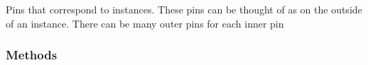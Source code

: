 \documentclass[letterpaper,10pt,english,openany,oneside]{sphinxmanual}
\begin{document}
\begin{fulllineitems}
\label{\detokenize{reference/classes/outerpin:spydrnet.OuterPin}}
Pins that correspond to instances. These pins can be thought of as on the outside of an instance. There can be many
outer pins for each inner pin

\end{fulllineitems}



\subsubsection{Methods}
\label{\detokenize{reference/classes/outerpin:methods}}
\end{document}
